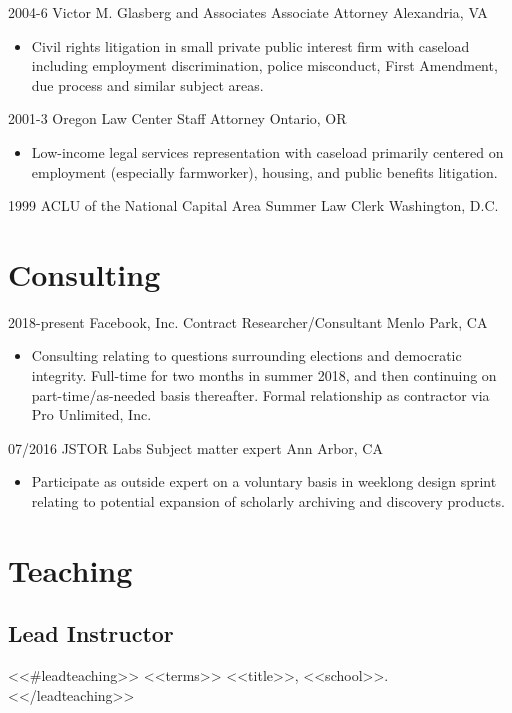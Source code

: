 \documentclass[letterpaper]{moderncv}
\begin{document}
\cventry
{2004-6}
{Victor M. Glasberg and Associates}
{Associate Attorney}
{Alexandria, VA}
{}
{\begin{itemize}%
	\item Civil rights litigation in small private public interest firm with caseload including employment discrimination,
    police misconduct, First Amendment, due process and similar subject areas.
	\end{itemize}}

\cventry
{2001-3}
{Oregon Law Center}
{Staff Attorney}
{Ontario, OR}
{}
{\begin{itemize}%
	\item Low-income legal services representation with caseload primarily centered on employment
    (especially farmworker), housing, and public benefits litigation.
	\end{itemize}}

\cventry
{1999}
{ACLU of the National Capital Area}
{Summer Law Clerk}
{Washington, D.C.}
{}
{}


\section{Consulting}

\cventry
{2018-present}
{Facebook, Inc.}
{Contract Researcher/Consultant}
{Menlo Park, CA}
{}
{\begin{itemize}%
	\item Consulting relating to questions surrounding elections and democratic
    integrity. Full-time for two months in summer 2018, and then continuing on
    part-time/as-needed basis thereafter. Formal relationship
    as contractor via Pro Unlimited, Inc.
	\end{itemize}}

\cventry
{07/2016}
{JSTOR Labs}
{Subject matter expert}
{Ann Arbor, CA}
{}
{\begin{itemize}%
	\item Participate as outside expert on a voluntary basis in weeklong design
    sprint relating to potential expansion of scholarly archiving and discovery products.
	\end{itemize}}

\section{Teaching}
\subsection{Lead Instructor}
<<#leadteaching>>
\cvitem
{<<terms>>}
{<<title>>, <<school>>.}
\vspace{1mm}
<</leadteaching>>
\end{document}
